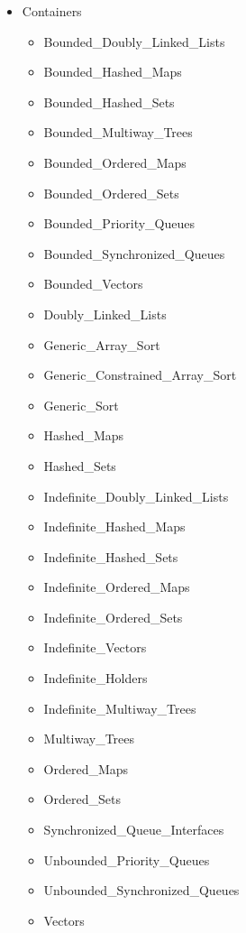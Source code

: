 \documentclass[english]{article}
\begin{document}
\begin{scriptsize}
\begin{multicols*}{5}
\begin{itemize}[leftmargin=0mm]
\begin{itemize}[leftmargin=5mm]
      \item[] Containers
         \begin{itemize}[leftmargin=5mm]
            \item[] Bounded\_Doubly\_Linked\_Lists
            \item[] Bounded\_Hashed\_Maps
            \item[] Bounded\_Hashed\_Sets
            \item[] Bounded\_Multiway\_Trees
            \item[] Bounded\_Ordered\_Maps
            \item[] Bounded\_Ordered\_Sets
            \item[] Bounded\_Priority\_Queues
            \item[] Bounded\_Synchronized\_Queues
            \item[] Bounded\_Vectors
            \item[] Doubly\_Linked\_Lists
            \item[] Generic\_Array\_Sort
            \item[] Generic\_Constrained\_Array\_Sort
            \item[] Generic\_Sort
            \item[] Hashed\_Maps
            \item[] Hashed\_Sets
            \item[] Indefinite\_Doubly\_Linked\_Lists
            \item[] Indefinite\_Hashed\_Maps
            \item[] Indefinite\_Hashed\_Sets
            \item[] Indefinite\_Ordered\_Maps
            \item[] Indefinite\_Ordered\_Sets
            \item[] Indefinite\_Vectors
            \item[] Indefinite\_Holders
            \item[] Indefinite\_Multiway\_Trees
            \item[] Multiway\_Trees
            \item[] Ordered\_Maps
            \item[] Ordered\_Sets
            \item[] Synchronized\_Queue\_Interfaces
            \item[] Unbounded\_Priority\_Queues
            \item[] Unbounded\_Synchronized\_Queues
            \item[] Vectors

\end{itemize}
\end{itemize}
\end{itemize}
\end{multicols*}
\end{scriptsize}
\end{document}
